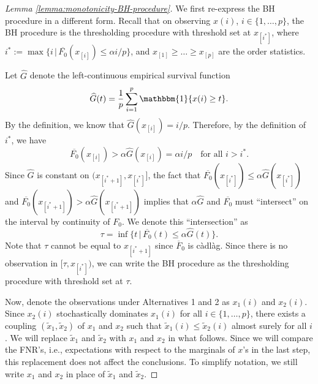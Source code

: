 \begin{proof}[Lemma \ref{lemma:monotonicity-BH-procedure}]
We first re-express the BH procedure in a different form.
Recall that on observing $x(i)$, $i\in\{1,\ldots,p\}$, the BH procedure is the thresholding procedure with threshold set at $x_{[i^*]}$, where $i^* := \max\{i\,|\,\overline{F_0}(x_{[i]})\le \alpha i/p\}$, and $x_{[1]}\ge\ldots\ge x_{[p]}$ are the order statistics.

Let $\widehat{G}$ denote the left-continuous empirical survival function
\begin{equation} \label{eq:empirical-tail-distribution}
    \widehat{G}(t) = \frac{1}{p}\sum_{i=1}^p\mathbbm{1}\{x(i) \ge t\}.
\end{equation}
By the definition, we know that $\widehat{G}(x_{[i]}) = i/p$.
Therefore, by the definition of $i^*$, we have
\begin{equation*} 
    \overline{F_0}(x_{[i]}) > \alpha\widehat{G}(x_{[i]}) = \alpha i/p \quad \text{for all }i>i^*.
\end{equation*}
Since $\widehat{G}$ is constant on $(x_{[i^*+1]}, x_{[i^*]}]$, the fact that 
$\overline{F_0}(x_{[i^*]}) \le \alpha\widehat{G}(x_{[i^*]})$ and $\overline{F_0}(x_{[i^*+1]}) > \alpha\widehat{G}(x_{[i^*+1]})$ implies that $\alpha\widehat{G}$ and $\overline{F_0}$ must ``intersect'' on the interval by continuity of $F_0$.
We denote this ``intersection'' as
\begin{equation} \label{eq:approx-boundary-proof-tau}
    \tau = \inf\{t\,|\,\overline{F_0}(t)\le\alpha\widehat{G}(t)\}. 
\end{equation}
Note that $\tau$ cannot be equal to $x_{[i^*+1]}$ since $\overline{F}_0$ is c\`adl\`ag.
Since there is no observation in $[\tau, x_{[i^*]})$, we can write the BH procedure as the thresholding procedure with threshold set at $\tau$.

Now, denote the observations under Alternatives 1 and 2 as $x_1(i)$ and $x_2(i)$.
Since $x_2(i)$ stochastically dominates $x_1(i)$ for all $i\in\{1,\ldots,p\}$, there exists a coupling $(\widetilde{x}_1, \widetilde{x}_2)$ of $x_1$ and $x_2$ such that 
$\widetilde{x}_1(i) \le \widetilde{x}_2(i)$ almost surely for all $i$.
We will replace $\widetilde{x}_1$ and $\widetilde{x}_2$ with $x_1$ and $x_2$ in what follows.
Since we will compare the FNR's, i.e., expectations with respect to the marginals of ${x}$'s in the last step, this replacement does not affect the conclusions.
To simplify notation, we still write $x_1$ and $x_2$ in place of $\widetilde{x}_1$ and $\widetilde{x}_2$.


\end{proof}
